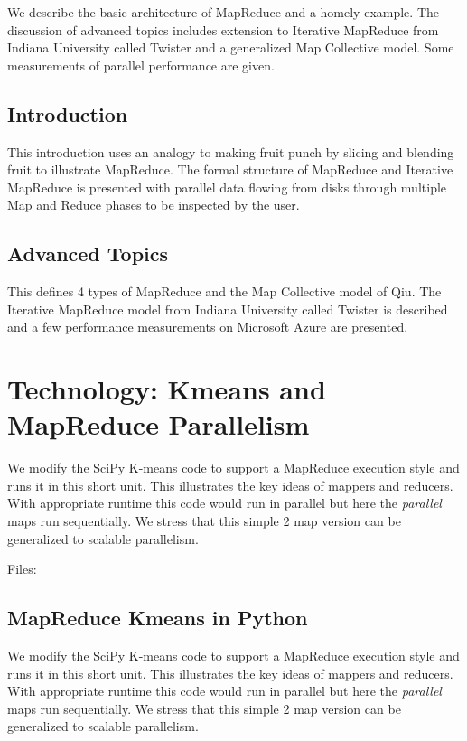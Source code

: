 We describe the basic architecture of MapReduce and a homely example.
The discussion of advanced topics includes extension to Iterative
MapReduce from Indiana University called Twister and a generalized Map
Collective model. Some measurements of parallel performance are given.

\subsection{Introduction}\label{introduction}

This introduction uses an analogy to making fruit punch by slicing and
blending fruit to illustrate MapReduce. The formal structure of
MapReduce and Iterative MapReduce is presented with parallel data
flowing from disks through multiple Map and Reduce phases to be
inspected by the user.

\subsection{Advanced Topics}\label{advanced-topics}

This defines 4 types of MapReduce and the Map Collective model of Qiu.
The Iterative MapReduce model from Indiana University called Twister is
described and a few performance measurements on Microsoft Azure are
presented.

\section{Technology: Kmeans and MapReduce
Parallelism}\label{technology-kmeans-and-mapreduce-parallelism}

We modify the SciPy K-means code to support a MapReduce execution style
and runs it in this short unit. This illustrates the key ideas of
mappers and reducers. With appropriate runtime this code would run in
parallel but here the \emph{parallel} maps run sequentially. We stress
that this simple 2 map version can be generalized to scalable
parallelism.

Files:


\subsection{MapReduce Kmeans in
Python}\label{mapreduce-kmeans-in-python}

We modify the SciPy K-means code to support a MapReduce execution style
and runs it in this short unit. This illustrates the key ideas of
mappers and reducers. With appropriate runtime this code would run in
parallel but here the \emph{parallel} maps run sequentially. We stress
that this simple 2 map version can be generalized to scalable
parallelism.


